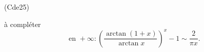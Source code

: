\begin{tiny}(Cde25)\end{tiny} à compléter
\[
 \text{ en } + \infty: \left( \frac{\arctan(1+x)}{\arctan x}\right)^{x} - 1 \sim \frac{2}{\pi x}.
\]
